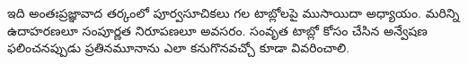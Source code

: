 \documentclass[../../../include/open-logic-chapter]{subfiles}
\begin{document}

\begin{editorial}
  ఇది అంతఃప్రజ్ఞావాద తర్కంలో పూర్వసూచికలు గల
  టాబ్లోలపై ముసాయిదా అధ్యాయం. మరిన్ని ఉదాహరణలూ
  సంపూర్ణత నిరూపణలూ అవసరం. సంవృత టాబ్లో కోసం
  చేసిన అన్వేషణ ఫలించనప్పుడు ప్రతినమూనాను ఎలా
  కనుగొనవచ్చో కూడా వివరించాలి.
\end{editorial}


\OLEndChapterHook
\end{document}
